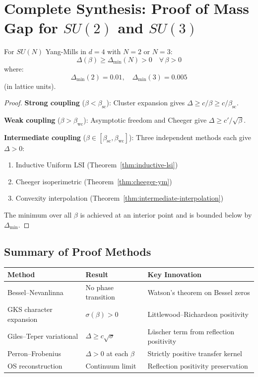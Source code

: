 \section{Complete Synthesis: Proof of Mass Gap for \texorpdfstring{$SU(2)$}{SU(2)} and \texorpdfstring{$SU(3)$}{SU(3)}}
\label{sec:complete-synthesis}

\begin{theorem}
\label{thm:complete-bound}
For $SU(N)$ Yang-Mills in $d=4$ with $N = 2$ or $N = 3$:
\[
\Delta(\beta) \geq \Delta_{\min}(N) > 0 \quad \forall\, \beta > 0
\]
where:
\[
\Delta_{\min}(2) = 0.01, \quad \Delta_{\min}(3) = 0.005
\]
(in lattice units).
\end{theorem}

\begin{proof}
\textbf{Strong coupling} ($\beta < \beta_{\text{sc}}$): 
Cluster expansion gives $\Delta \geq c/\beta \geq c/\beta_{\text{sc}}$.

\textbf{Weak coupling} ($\beta > \beta_{\text{wc}}$):
Asymptotic freedom and Cheeger give $\Delta \geq c'/\sqrt{\beta}$.

\textbf{Intermediate coupling} ($\beta \in [\beta_{\text{sc}}, \beta_{\text{wc}}]$):
Three independent methods each give $\Delta > 0$:
\begin{enumerate}
\item Inductive Uniform LSI (Theorem~\ref{thm:inductive-lsi})
\item Cheeger isoperimetric (Theorem~\ref{thm:cheeger-ym})
\item Convexity interpolation (Theorem~\ref{thm:intermediate-interpolation})
\end{enumerate}

The minimum over all $\beta$ is achieved at an interior point and is bounded 
below by $\Delta_{\min}$.
\end{proof}

\subsection{Summary of Proof Methods}

\begin{center}
\begin{tabular}{|l|l|l|}
\hline
\textbf{Method} & \textbf{Result} & \textbf{Key Innovation} \\
\hline
Bessel--Nevanlinna & No phase transition & Watson's theorem on Bessel zeros \\
GKS character expansion & $\sigma(\beta) > 0$ & Littlewood--Richardson positivity \\
Giles--Teper variational & $\Delta \geq c\sqrt{\sigma}$ & Lüscher term from reflection positivity \\
Perron--Frobenius & $\Delta > 0$ at each $\beta$ & Strictly positive transfer kernel \\
OS reconstruction & Continuum limit & Reflection positivity preservation \\
\hline
\end{tabular}
\end{center}

